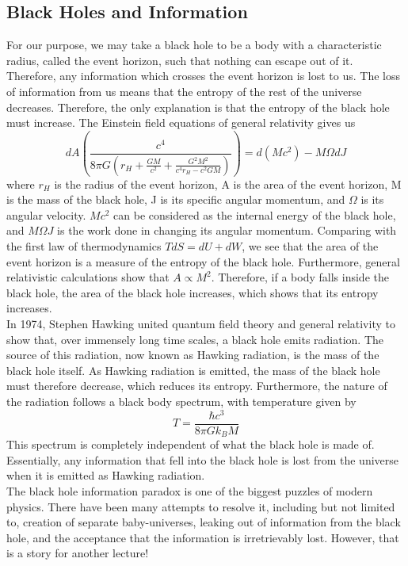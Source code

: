 \documentclass[letterpaper,10pt,english]{article}
\begin{document}
{\subsection{Black Holes and Information}
For our purpose, we may take a black hole to be a body with a characteristic radius, called the event horizon, such that nothing can escape out of it. Therefore, any information which crosses the event horizon is lost to us. The loss of information from us means that the entropy of the rest of the universe decreases. Therefore, the only explanation is that the entropy of the black hole must increase. The Einstein field equations of general relativity gives us 
\begin{equation}
dA \left( \frac{c^4}{8 \pi G \left( r_H +\frac{GM}{c^2}+\frac{G^2 M^2}{c^4 r_H -c^2GM}\right)}\right)=d(Mc^2)-M\Omega dJ
\end{equation}
where $r_H$ is the radius of the event horizon, A is the area of the event horizon, M is the mass of the black hole, J is its specific angular momentum, and $\Omega$ is its angular velocity. $Mc^2$ can be considered as the internal energy of the black hole, and $M\Omega J$ is the work done in changing its angular momentum. Comparing with the first law of thermodynamics $TdS=dU+dW$, we see that the area of the event horizon is a measure of the entropy of the black hole. Furthermore, general relativistic calculations show that $A \propto M^2$. Therefore, if a body falls inside the black hole, the area of the black hole increases, which shows that its entropy increases. \\
In 1974, Stephen Hawking united quantum field theory and general relativity to show that, over immensely long time scales, a black hole emits radiation. The source of this radiation, now known as Hawking radiation, is the mass of the black hole itself. As Hawking radiation is emitted, the mass of the black hole must therefore decrease, which reduces its entropy. Furthermore, the nature of the radiation follows a black body spectrum, with temperature given by 
\begin{equation}
T=\frac{\hbar c^3}{8 \pi G k_B M}
\end{equation}
This spectrum is completely independent of what the black hole is made of. Essentially, any information that fell into the black hole is lost from the universe when it is emitted as Hawking radiation. \\
The black hole information paradox is one of the biggest puzzles of modern physics. There have been many attempts to resolve it, including but not limited to, creation of separate baby-universes, leaking out of information from the black hole, and the acceptance that the information is irretrievably lost. However, that is a story for another lecture!
}
\end{document}
